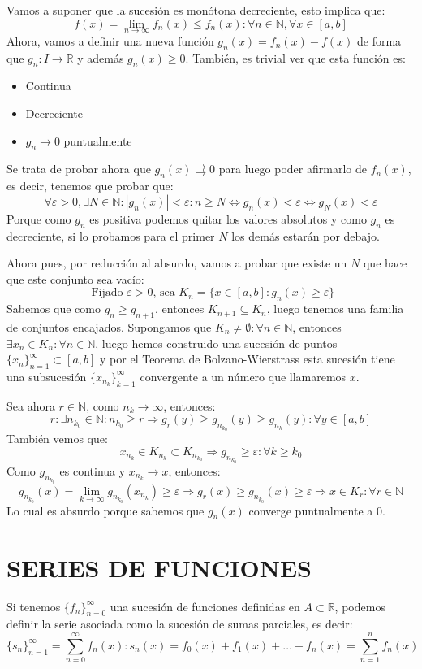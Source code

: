 \documentclass[10pt,a4paper,openright]{book}
\begin{document}
Vamos a suponer que la sucesión es monótona decreciente, esto implica que:
$$f(x) = \lim_{n \to \infty} f_n (x) \leq f_n (x) : \forall n \in \mathbb N, \forall x \in [a,b]$$
Ahora, vamos a definir una nueva función $g_n(x) = f_n(x)-f(x)$ de forma que $g_n : I \rightarrow \mathbb R$ y además $g_n(x) \geq 0$. También, es trivial ver que esta función es:
\begin{itemize}
\item Continua
\item Decreciente
\item $g_n \rightarrow 0$ puntualmente
\end{itemize}
Se trata de probar ahora que $g_n(x)\rightrightarrows 0$ para luego poder afirmarlo de $f_n(x)$, es decir, tenemos que probar que:
$$ \forall \varepsilon > 0, \exists N \in \mathbb{N} : |g_n (x)| < \varepsilon : n \geq N \Leftrightarrow g_n(x) < \varepsilon \Leftrightarrow g_N(x)< \varepsilon$$
Porque como $g_n$ es positiva podemos quitar los valores absolutos y como $g_n$ es decreciente, si lo probamos para el primer $N$ los demás estarán por debajo.

Ahora pues, por reducción al absurdo, vamos a probar que existe un $N$ que hace que este conjunto sea vacío:
$$ \mbox{ Fijado $\varepsilon >0$, sea }K_n = \{ x \in [a,b] : g_n (x) \geq \varepsilon\}$$
Sabemos que como $g_n \geq g_{n+1}$, entonces $K_{n+1} \subseteq K_n$, luego tenemos una familia de conjuntos encajados. Supongamos que $K_n \neq \emptyset: \forall n \in \mathbb N$, entonces $\exists x_n \in K_n: \forall n \in \mathbb N$, luego hemos construido una sucesión de puntos $\{x_n\}_{n=1}^\infty \subset [a,b]$ y por el Teorema de Bolzano-Wierstrass esta sucesión tiene una subsucesión $\{x_{n_k}\}_{k=1}^\infty$ convergente a un número que llamaremos $x$.

Sea ahora $r\in \mathbb N$, como $n_k \rightarrow \infty$, entonces:
$$r: \exists n_{k_0}\in \mathbb N: n_{k_0} \geq r \Rightarrow g_r(y)\geq g_{n_{k_0}}(y) \geq g_{n_k}(y) : \forall y \in [a,b]$$
También vemos que:
$$x_{n_k}\in K_{n_k} \subset K_{n_{k_0}} \Rightarrow g_{n_{k_0}}\geq \varepsilon : \forall k \geq k_0$$
Como $g_{n_{k_0}}$ es continua y $x_{n_k}\rightarrow x$, entonces:
$$g_{n_{k_0}} (x) = \lim_{k \to \infty} g_{n_{k_0}} (x_{n_k}) \geq \varepsilon \Rightarrow g_r (x) \geq g_{n_{k_0}} (x) \geq \varepsilon \Rightarrow x \in K_r : \forall r \in \mathbb{N}$$
Lo cual es absurdo porque sabemos que $g_n(x)$ converge puntualmente a 0.

\section*{SERIES DE FUNCIONES}
Si tenemos $\{f_n\}_{n = 0}^\infty$ una sucesión de funciones definidas en $A \subset \mathbb{R}$, podemos definir la serie asociada como la sucesión de sumas parciales, es decir:
$$\{s_n\}_{n = 1}^\infty = \sum_{n=0}^{\infty} f_n (x) : s_n (x) = f_0 (x) + f_1 (x) + \ldots + f_n (x) = \sum_{n=1}^{n} f_n (x)$$
\end{document}
